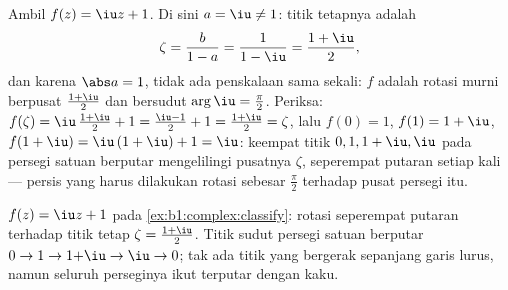 \begin{example}\label{ex:b1:complex:classify}
Ambil $f(z) = \iu z + 1$. Di sini $a = \iu \neq 1$: titik tetapnya adalah
\[
\zeta = \frac{b}{1 - a} = \frac1{1 - \iu}
= \frac{1 + \iu}{2},
\]
dan karena $\abs a = 1$, tidak ada penskalaan sama sekali: $f$ adalah rotasi
murni berpusat $\frac{1+\iu}2$ dan bersudut $\arg \iu = \frac\pi2$.
Periksa: $f(\zeta) = \iu\,\frac{1+\iu}2 + 1 = \frac{\iu - 1}2 + 1 =
\frac{1 + \iu}2 = \zeta$, lalu $f(0) = 1$, $f(1) = 1 + \iu$, $f(1 +
\iu) = \iu\,(1 + \iu) + 1 = \iu$: keempat titik $0, 1, 1+\iu, \iu$
pada persegi satuan berputar mengelilingi pusatnya $\zeta$, seperempat
putaran setiap kali --- persis yang harus dilakukan rotasi sebesar $\frac\pi2$
terhadap pusat persegi itu.
\end{example}

\begin{omfigure}

{\small {} $f(z) = \iu z + 1$ pada
\cref{ex:b1:complex:classify}: rotasi seperempat putaran terhadap
titik tetap $\zeta = \frac{1+\iu}2$. Titik sudut persegi satuan
berputar $0 \to 1 \to 1{+}\iu \to \iu \to 0$; tak ada titik yang bergerak
sepanjang garis lurus, namun seluruh perseginya ikut terputar dengan kaku.}
\end{omfigure}

